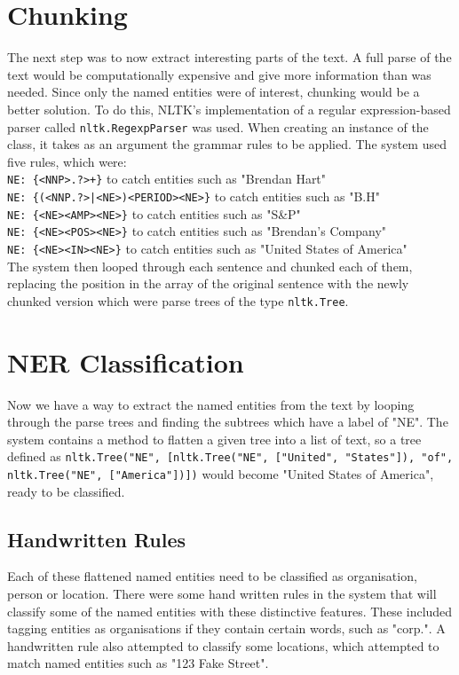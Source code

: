 \documentclass[10pt]{article}
\begin{document}
\begin{multicols}{2}
\section{Chunking}
The next step was to now extract interesting parts of the text. A full parse of the text would be computationally expensive and give more information than was needed. Since only the named entities were of interest, chunking would be a better solution. To do this, NLTK's implementation of a regular expression-based parser called {{\tt nltk.RegexpParser}} was used. When creating an instance of the class, it takes as an argument the grammar rules to be applied. The system used five rules, which were: 
\\{{\tt NE: \{<NNP>.?>+\}}} to catch entities such as "Brendan Hart"
\\{{\tt NE: \{(<NNP.?>|<NE>)<PERIOD><NE>\}}} to catch entities such as "B.H"
\\{{\tt NE: \{<NE><AMP><NE>\}}} to catch entities such as "S\&P"
\\{{\tt NE: \{<NE><POS><NE>\}}} to catch entities such as "Brendan's Company"
\\{{\tt NE: \{<NE><IN><NE>\}}} to catch entities such as "United States of America"\\
The system then looped through each sentence and chunked each of them, replacing the position in the array of the original sentence with the newly chunked version which were parse trees of the type {{\tt nltk.Tree}}.

\section{NER Classification}
Now we have a way to extract the named entities from the text by looping through the parse trees and finding the subtrees which have a label of "NE". The system contains a method to flatten a given tree into a list of text, so a tree defined as {{\tt nltk.Tree("NE", [nltk.Tree("NE", ["United", "States"]), "of", nltk.Tree("NE", ["America"])])}} would become "United States of America", ready to be classified.
\subsection{Handwritten Rules}
Each of these flattened named entities need to be classified as organisation, person or location. There were some hand written rules in the system that will classify some of the named entities with these distinctive features. These included tagging entities as organisations if they contain certain words, such as "corp.". A handwritten rule also attempted to classify some locations, which attempted to match named entities such as "123 Fake Street".

\end{multicols}
\end{document}
